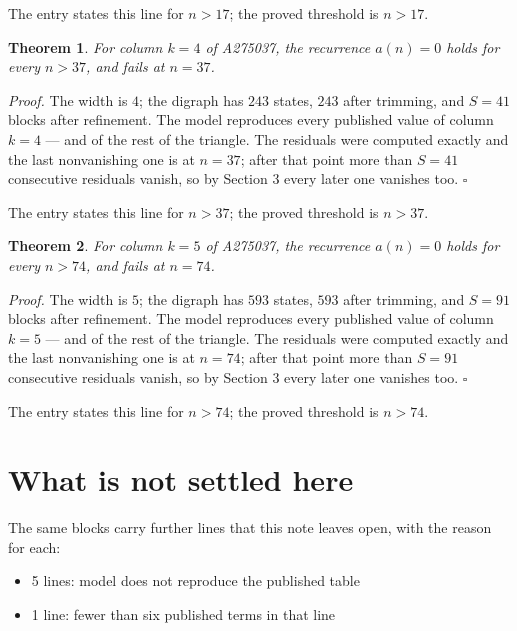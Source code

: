 \documentclass[11pt]{article}
\newtheorem{theorem}{Theorem}
\theoremstyle{definition}
\begin{document}
The entry states this line for $n > 17$; the proved threshold is $n > 17$.

\begin{theorem} For column $k = 4$ of A275037, the recurrence $a(n) = 0$ holds for every $n > 37$, and fails at $n = 37$.\end{theorem}

{\itshape Proof.} The width is $4$; the digraph has $243$ states, $243$ after trimming, and $S = 41$ blocks after refinement. The model reproduces every published value of column $k = 4$ --- and of the rest of the triangle. The residuals were computed exactly and the last nonvanishing one is at $n = 37$; after that point more than $S = 41$ consecutive residuals vanish, so by Section 3 every later one vanishes too. $\square$

The entry states this line for $n > 37$; the proved threshold is $n > 37$.

\begin{theorem} For column $k = 5$ of A275037, the recurrence $a(n) = 0$ holds for every $n > 74$, and fails at $n = 74$.\end{theorem}

{\itshape Proof.} The width is $5$; the digraph has $593$ states, $593$ after trimming, and $S = 91$ blocks after refinement. The model reproduces every published value of column $k = 5$ --- and of the rest of the triangle. The residuals were computed exactly and the last nonvanishing one is at $n = 74$; after that point more than $S = 91$ consecutive residuals vanish, so by Section 3 every later one vanishes too. $\square$

The entry states this line for $n > 74$; the proved threshold is $n > 74$.

\section{What is not settled here}

The same blocks carry further lines that this note leaves open, with the reason for each:

\begin{itemize}

\item 5 lines: model does not reproduce the published table

\item 1 line: fewer than six published terms in that line

\end{itemize}
\end{document}
